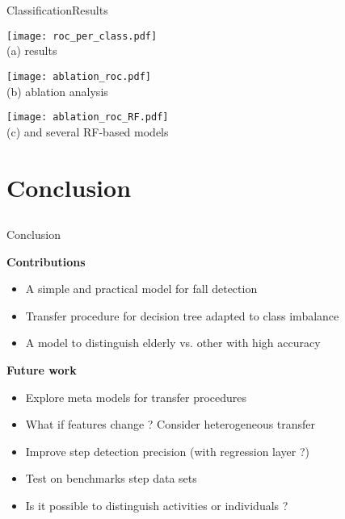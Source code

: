 \begin{frame}{Classification}{Results}
\renewcommand{\ratiob}{0.98}
    \begin{minipage}{\linewidth}
        \centering
        \begin{minipage}[t]{0.33\linewidth}
            \centering
            \texttt{[image: roc\_per\_class.pdf]}\\
            {\small(a)\; \algo results}
        \end{minipage}\hfill
        \begin{minipage}[t]{0.33\linewidth}
            \centering
            \texttt{[image: ablation\_roc.pdf]}\\
            {\small(b)\; \algo ablation analysis}
        \end{minipage}\hfill
        \begin{minipage}[t]{0.33\linewidth}
            \centering
            \texttt{[image: ablation\_roc\_RF.pdf]}\\
            {\small(c)\; \algo and several RF-based models}
        \end{minipage}
    \end{minipage}

\end{frame}


\section{Conclusion}
\subsection{}

\begin{frame}{Conclusion}

\centering
\begin{minipage}[t]{0.8\linewidth}
\centering
\textbf{Contributions}

\begin{itemize}
    \item A simple and practical model for fall detection
    \item Transfer procedure for decision tree adapted to class imbalance
    \item A model to distinguish elderly vs. other with high accuracy
\end{itemize}
\textbf{Future work}
\begin{itemize}
    \item Explore meta models for transfer procedures
    \item What if features change ? Consider heterogeneous transfer
    \item Improve step detection precision (with regression layer ?)
    \item Test on benchmarks step data sets
    \item Is it possible to distinguish activities or individuals ?
\end{itemize}
\end{minipage}

\vfill
\end{frame}
